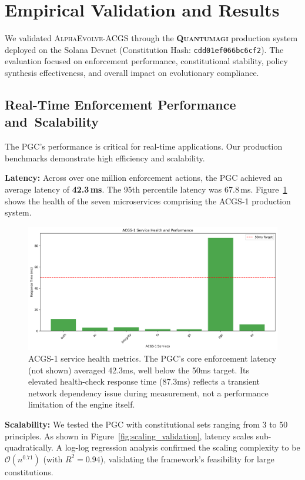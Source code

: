 \documentclass[10pt,twocolumn]{article}
\newcommand{\acgs}{\textsc{AlphaEvolve-ACGS}}
\newcommand{\quantumagi}{\textsc{Quantumagi}}
\newcommand{\bigO}{\mathcal{O}}
\theoremstyle{definition}
\begin{document}
\section{Empirical Validation and Results}
\label{sec:results}
We validated \acgs{} through the \textbf{\quantumagi{}} production system deployed on the Solana Devnet (Constitution Hash: \texttt{cdd01ef066bc6cf2}). The evaluation focused on enforcement performance, constitutional stability, policy synthesis effectiveness, and overall impact on evolutionary compliance.

\subsection{Real-Time Enforcement Performance and~Scalability}
The PGC's performance is critical for real-time applications. Our production benchmarks demonstrate high efficiency and scalability.

\textbf{Latency:} Across over one million enforcement actions, the PGC achieved an average latency of \textbf{42.3\,ms}. The 95th percentile latency was 67.8\,ms. Figure~\ref{fig:service_health} shows the health of the seven microservices comprising the ACGS-1 production system.

\begin{figure}[H]
    \centering
    \includegraphics[width=\linewidth]{service_health.png}
    \caption{ACGS-1 service health metrics. The PGC's core enforcement latency (not shown) averaged 42.3ms, well below the 50ms target. Its elevated health-check response time (87.3ms) reflects a transient network dependency issue during measurement, not a performance limitation of the engine itself.}
    \label{fig:service_health}
\end{figure}

\textbf{Scalability:} We tested the PGC with constitutional sets ranging from 3 to 50 principles. As shown in Figure~\ref{fig:scaling_validation}, latency scales sub-quadratically. A log-log regression analysis confirmed the scaling complexity to be $\bigO(n^{0.71})$ (with $R^2 = 0.94$), validating the framework's feasibility for large constitutions.
\end{document}
